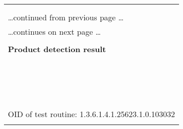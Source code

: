\documentclass{article}
\begin{document}
\begin{longtable}{|p{}|}
\hline
\rowcolor{openvas_warning}{\color{white}{Medium (CVSS: 4.3) }}\\
\rowcolor{openvas_warning}{\color{white}{NVT: Apache Tomcat 'sort' and 'orderBy' Parameters Cross Site Scripting Vulnerabilities}}\\
\hline
\endfirsthead
\hfill\ldots continued from previous page \ldots \\
\hline
\endhead
\hline
\ldots continues on next page \ldots \\
\endfoot
\hline
\endlastfoot
\\
\textbf{Product detection result}\\
\rowcolor{white}{\verb=cpe:/a:apache:tomcat:6.0.24=}\\
\rowcolor{white}{\verb=Detected by Apache Tomcat Version Detection (OID: 1.3.6.1.4.1.25623.1.0.800371)=}\\
\\
\hline
\\
\rowcolor{white}{\verb= Summary:=}\\
\rowcolor{white}{\verb= Apache Tomcat is prone to multiple cross-site scripting=}\\
\rowcolor{white}{\verb=vulnerabilities because it fails to properly sanitize user-=}\\
\rowcolor{white}{\verb=supplied input.=}\\
\rowcolor{white}{\verb=An attacker may leverage these issues to execute arbitrary script code=}\\
\rowcolor{white}{\verb=in the browser of an unsuspecting user in the context of the affected=}\\
\rowcolor{white}{\verb=site. This may let the attacker steal cookie-based authentication=}\\
\rowcolor{white}{\verb=credentials and launch other attacks.=}\\
\rowcolor{white}{\verb= Solution:=}\\
\rowcolor{white}{\verb= Updates are available; please see the references for more information.=}\\
\rowcolor{white}{\verb==}\\
\rowcolor{white}{\verb==}\\
\\
OID of test routine: 1.3.6.1.4.1.25623.1.0.103032\\
\\


\end{longtable}
\end{document}
